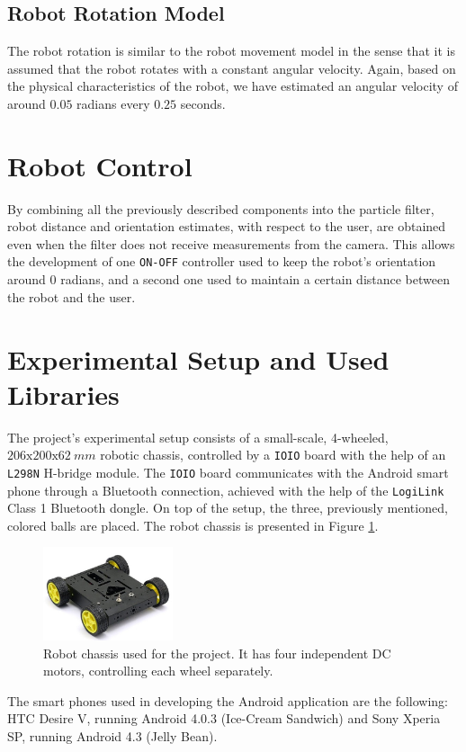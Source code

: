 \documentclass[journal]{IEEEtran}
\let\MYoriglatexcaption\caption
\renewcommand{\caption}[2][\relax]{\MYoriglatexcaption[#2]{#2}}
\begin{document}
\subsection{Robot Rotation Model}
The robot rotation is similar to the robot movement model in the sense that it is assumed that the robot rotates with a constant angular velocity. Again, based on the physical characteristics of the robot, we have estimated an angular velocity of around $0.05$ radians every $0.25$ seconds.

\section{Robot Control}
By combining all the previously described components into the particle filter, robot distance and orientation estimates, with respect to the user, are obtained even when the filter does not receive measurements from the camera. This allows the development of one \texttt{ON-OFF} controller used to keep the robot's orientation around $0$ radians, and a second one used to maintain a certain distance between the robot and the user.

\section{Experimental Setup and Used Libraries}
The project's experimental setup consists of a small-scale, 4-wheeled, $206\mathrm{x}200\mathrm{x}62\ mm$ robotic chassis, controlled by a \texttt{IOIO} board with the help of an \texttt{L298N} H-bridge module. The \texttt{IOIO} board communicates with the Android smart phone through a Bluetooth connection, achieved with the help of the \texttt{LogiLink} Class 1 Bluetooth dongle. On top of the setup, the three, previously mentioned, colored balls are placed. The robot chassis is presented in Figure \ref{fig:robot}.
\begin{figure}[!htpb]
  \centering
  \includegraphics[width=1.5in]{images/robot}
  \caption{Robot chassis used for the project. It has four independent DC motors, controlling each wheel separately.}
  \label{fig:robot}
\end{figure}

The smart phones used in developing the Android application are the following: HTC Desire V, running Android 4.0.3 (Ice-Cream Sandwich) and Sony Xperia SP, running Android 4.3 (Jelly Bean).
\end{document}
